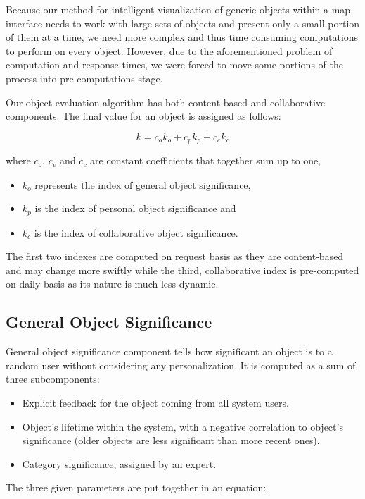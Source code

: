 \documentclass[10pt]{article}
\begin{document}
Because our method for intelligent visualization of generic objects within a map interface needs to work with large sets of objects and present only a small portion of them at a time, we need more complex and thus time consuming computations to perform on every object. However, due to the aforementioned problem of computation and response times, we were forced to move some portions of the process into pre-computations stage.

Our object evaluation algorithm has both content-based and collaborative components. 
The final value for an object is assigned as follows:
 
$$k=c_ok_o+c_pk_p+c_ck_c $$

where $c_o$, $c_p$ and $c_c$ are constant coefficients that together sum up to one,
\begin{itemize}
\item $k_o$ represents the index of general object significance,
\item $k_p$ is the index of personal object significance and
\item $k_c$ is the index of collaborative object significance.
\end{itemize}

The first two indexes are computed on request basis as they are content-based and may change more swiftly while the third, collaborative index is pre-computed on daily basis as its nature is much less dynamic.

\subsection{General Object Significance}

General object significance component tells how significant an object is to a random user without considering any personalization. It is computed as a sum of three subcomponents:

\begin{itemize}
\item Explicit feedback for the object coming from all system users.
\item Object's lifetime within the system, with a negative correlation to object's significance (older objects are less significant than more recent ones).
\item Category significance, assigned by an expert.
\end{itemize}

The three given parameters are put together in an equation:
\end{document}
